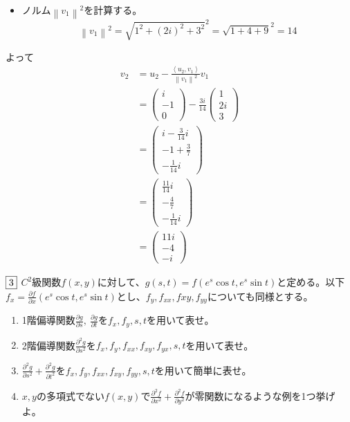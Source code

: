 \documentclass[dvipdfmx]{jsreport}
\newcommand{\norm}[1]{\left\|#1\right\|} %
\newcommand{\innerproduct}[2]{\left\langle{#1}, {#2}\right\rangle}
\newcounter{num}[section]
\begin{document}
\begin{answer}
\begin{enumerate}
\begin{itemize}
	\item ノルム$\norm{v_1}^2$を計算する。
\begin{equation*}
	\norm{v_1}^2= \sqrt{1^2+ (2i)^2+ 3^2}^2= \sqrt{1+ 4+ 9}^2= 14
\end{equation*}
\end{itemize}
	よって
\begin{align*}
	v_2
	&= u_2- \frac{\innerproduct{u_2}{v_1}}{\norm{v_1}^2}v_1\\
	&= \begin{pmatrix}i\\ -1\\ 0\end{pmatrix}- \frac{3i}{14}\begin{pmatrix}1\\ 2i\\ 3\end{pmatrix}\\
	&= \begin{pmatrix}i- \frac{3}{14}i\\ -1+ \frac{3}{7}\\ -\frac{1}{14}i\end{pmatrix}\\
	&= \begin{pmatrix}\frac{11}{14}i\\ -\frac{4}{7}\\ -\frac{1}{14}i\end{pmatrix}\\
	&= \begin{pmatrix}11i\\ -4\\ -i\end{pmatrix}
\end{align*}
\end{enumerate}
\end{answer}

\begin{tcolorbox} %
	$\fbox{3}$ $C^2$級関数$f(x, y)$に対して、$g(s, t)= f(e^s \cos{t}, e^s \sin{t})$と定める。以下$f_x= \frac{\partial f}{\partial x}(e^s \cos{t}, e^s \sin{t})$とし、$f_y, f_{xx}, f{xy}, f_{yy}$についても同様とする。
\begin{enumerate}
	\item 1階偏導関数$\frac{\partial g}{\partial s},\ \frac{\partial g}{\partial t}$を$f_x, f_y, s, t$を用いて表せ。
	\item 2階偏導関数$\frac{\partial^2 g}{\partial s^2}$を$f_x, f_y, f_{xx}, f_{xy}, f_{yx}, s, t$を用いて表せ。
	\item $\frac{\partial^2 g}{\partial s^2}+ \frac{\partial^2 g}{\partial t^2}$を$f_x, f_y, f_{xx}, f_{xy}, f_{yy}, s, t$を用いて簡単に表せ。
	\item $x, y$の多項式でない$f(x, y)$で$\frac{\partial^2 f}{\partial x^2}+ \frac{\partial^2 f}{\partial y^2}$が零関数になるような例を1つ挙げよ。
\end{enumerate}
\end{tcolorbox}
\end{document}
